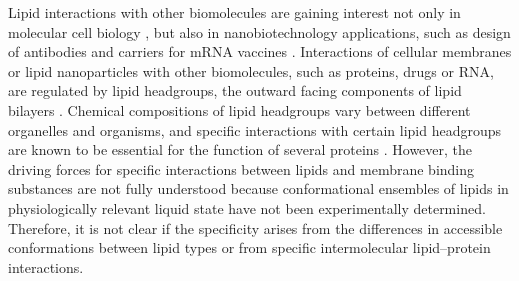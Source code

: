 \documentclass[journal=jpcbfk,manuscript=article]{achemso}
\begin{document}
Lipid interactions with other biomolecules are gaining interest
not only in molecular cell biology \cite{harayama18}, but also in
nanobiotechnology applications, such as design of antibodies \cite{vigant15}
and carriers for mRNA vaccines \cite{pardi18,schoenmaker21}.
Interactions of cellular membranes or lipid nanoparticles with other biomolecules,
such as proteins, drugs or RNA, are regulated by lipid headgroups,
the outward facing components of lipid bilayers \cite{harayama18,vanmeer08}.
Chemical compositions of lipid headgroups vary between different
organelles and organisms, and specific interactions with certain lipid headgroups
are known to be essential for the function of several proteins \cite{harayama18,vanmeer08}.
However, the driving forces for specific interactions between lipids and membrane binding
substances are not fully understood because conformational ensembles of lipids in
physiologically relevant liquid state have not been experimentally determined.
Therefore, it is not clear if the specificity arises from the
differences in accessible conformations between lipid types or
from specific intermolecular lipid--protein interactions.
\end{document}

